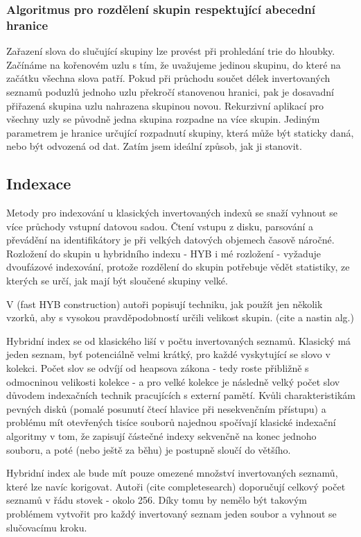 \documentclass[11pt,letterpaper,oneside,openright]{book}
\begin{document}
\subsubsection{Algoritmus pro rozdělení skupin respektující abecední hranice}
Zařazení slova do slučující skupiny lze provést při prohledání trie do hloubky.
Začínáme na kořenovém uzlu s tím, že uvažujeme jedinou skupinu, do které na
začátku všechna slova patří. Pokud při průchodu součet délek invertovaných
seznamů poduzlů jednoho uzlu překročí stanovenou hranici, pak je dosavadní
přiřazená skupina uzlu nahrazena skupinou novou. Rekurzivní aplikací pro
všechny uzly se původně jedna skupina rozpadne na více skupin. Jediným
parametrem je hranice určující rozpadnutí skupiny, která může být staticky
daná, nebo být odvozená od dat. Zatím jsem ideální způsob, jak ji stanovit.


\subsection{Indexace}
Metody pro indexování u klasických invertovaných indexů se snaží vyhnout se
více průchody vstupní datovou sadou. Čtení vstupu z disku, parsování a
převádění na identifikátory je při velkých datových objemech časově náročné.
Rozložení do skupin u hybridního indexu - HYB i mé rozložení - vyžaduje
dvoufázové indexování, protože rozdělení do skupin potřebuje vědět statistiky,
ze kterých se určí, jak mají být sloučené skupiny velké.

V (fast HYB construction) autoři popisují techniku, jak použít jen několik
vzorků, aby s vysokou pravděpodobností určili velikost skupin. (cite a nastin
alg.)

Hybridní index se od klasického liší v počtu invertovaných seznamů. Klasický má
jeden seznam, byť potenciálně velmi krátký, pro každé vyskytující se slovo v
kolekci. Počet slov se odvíjí od heapsova zákona - tedy roste přibližně s
odmocninou velikosti kolekce - a pro velké kolekce je následně velký počet slov
důvodem indexačních technik pracujících s externí pamětí. Kvůli
charakteristikám pevných disků (pomalé posunutí čtecí hlavice při nesekvenčním
přístupu) a problému mít otevřených tisíce souborů najednou spočívají klasické
indexační algoritmy v tom, že zapisují částečné indexy sekvenčně na konec
jednoho souboru, a poté (nebo ještě za běhu) je postupně sloučí do většího.


Hybridní index ale bude mít pouze omezené množství invertovaných seznamů, které
lze navíc korigovat. Autoři (cite completesearch) doporučují celkový počet
seznamů v řádu stovek - okolo 256. Díky tomu by nemělo být takovým problémem
vytvořit pro každý invertovaný seznam jeden soubor a vyhnout se slučovacímu
kroku.
\end{document}
